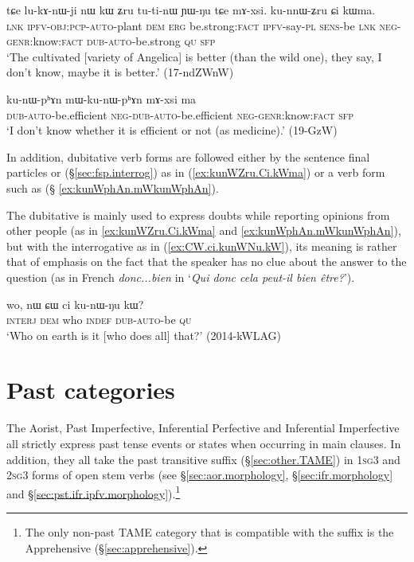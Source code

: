  \begin{exe}
\ex \label{ex:kunWZru.Ci.kWma}
 \gll  tɕe lu-kɤ-nɯ-ji nɯ kɯ ʑru tu-ti-nɯ ɲɯ-ŋu tɕe mɤ-xsi. ku-nnɯ-ʑru ɕi kɯma. \\
 \textsc{lnk} \textsc{ipfv}-\textsc{obj}:\textsc{pcp}-\textsc{auto}-plant \textsc{dem} \textsc{erg} be.strong:\textsc{fact} \textsc{ipfv}-say-\textsc{pl} \textsc{sens}-be \textsc{lnk} \textsc{neg}-\textsc{genr}:know:\textsc{fact}  \textsc{dub}-\textsc{auto}-be.strong \textsc{qu} \textsc{sfp} \\
 \glt `The cultivated [variety of Angelica] is better (than the wild one), they say, I don't know, maybe it is better.' (17-ndZWnW)
 \end{exe}
 

\begin{exe}
\ex \label{ex:kunWphAn.mWkunWphAn}
 \gll  ku-nɯ-pʰɤn mɯ-ku-nɯ-pʰɤn mɤ-xsi ma \\
 \textsc{dub}-\textsc{auto}-be.efficient \textsc{neg}-\textsc{dub}-\textsc{auto}-be.efficient \textsc{neg}-\textsc{genr}:know:\textsc{fact} \textsc{sfp} \\
\glt `I don't know whether it is efficient or not (as medicine).' (19-GzW) 
  \end{exe}
 
In addition, dubitative verb forms are followed either by the sentence final particles  or  (§\ref{sec:fsp.interrog}) as in (\ref{ex:kunWZru.Ci.kWma}) or a verb form such as  (§ \ref{ex:kunWphAn.mWkunWphAn}).

The dubitative is mainly used to express doubts while reporting opinions from other people (as in \ref{ex:kunWZru.Ci.kWma} and \ref{ex:kunWphAn.mWkunWphAn}), but with the interrogative  as in (\ref{ex:CW.ci.kunWNu.kW}), its meaning is rather that of emphasis on the fact that the speaker has no clue about the answer to the question (as in French \textit{donc...bien} in `\textit{Qui donc cela peut-il bien être?}').

\begin{exe}
\ex \label{ex:CW.ci.kunWNu.kW}
 \gll wo, nɯ ɕɯ ci ku-nɯ-ŋu kɯ?  \\
 \textsc{interj} \textsc{dem} who \textsc{indef} \textsc{dub}-\textsc{auto}-be \textsc{qu} \\
\glt `Who on earth is it [who does all] that?' (2014-kWLAG)
 \end{exe}
 
\section{Past categories}   \label{sec:TAME.pst}
The Aorist, Past Imperfective, Inferential Perfective and Inferential Imperfective all strictly express past tense events or states when occurring in main clauses. In addition, they all take the past transitive  suffix (§\ref{sec:other.TAME}) in \textsc{1sg}\fl{}3 and \textsc{2sg}\fl{}3 forms of open stem verbs (see §\ref{sec:aor.morphology}, §\ref{sec:ifr.morphology} and §\ref{sec:pst.ifr.ipfv.morphology}).\footnote{The only non-past TAME category that is compatible with the  suffix is the Apprehensive (§\ref{sec:apprehensive}). }

